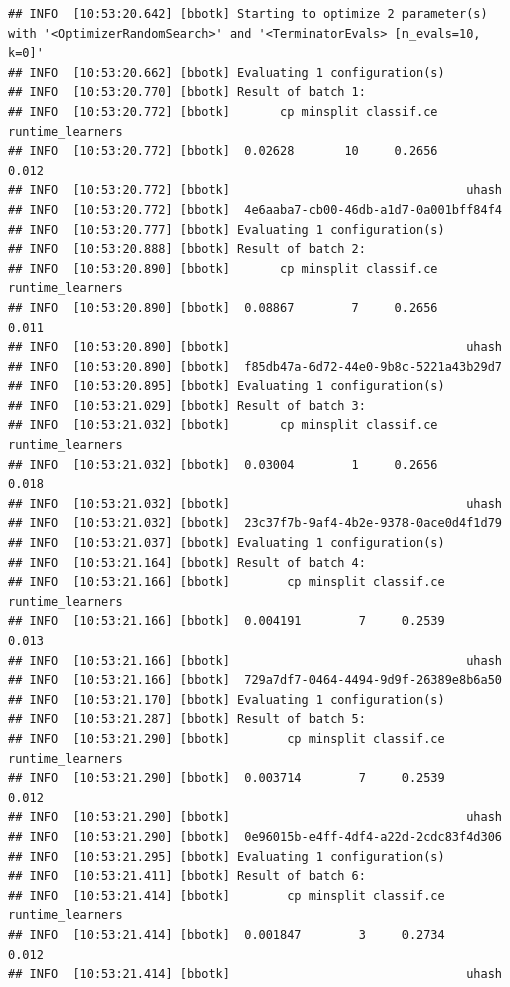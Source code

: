 \documentclass[
]{scrbook}
\begin{document}
\begin{verbatim}
## INFO  [10:53:20.642] [bbotk] Starting to optimize 2 parameter(s) with '<OptimizerRandomSearch>' and '<TerminatorEvals> [n_evals=10, k=0]' 
## INFO  [10:53:20.662] [bbotk] Evaluating 1 configuration(s) 
## INFO  [10:53:20.770] [bbotk] Result of batch 1: 
## INFO  [10:53:20.772] [bbotk]       cp minsplit classif.ce runtime_learners 
## INFO  [10:53:20.772] [bbotk]  0.02628       10     0.2656            0.012 
## INFO  [10:53:20.772] [bbotk]                                 uhash 
## INFO  [10:53:20.772] [bbotk]  4e6aaba7-cb00-46db-a1d7-0a001bff84f4 
## INFO  [10:53:20.777] [bbotk] Evaluating 1 configuration(s) 
## INFO  [10:53:20.888] [bbotk] Result of batch 2: 
## INFO  [10:53:20.890] [bbotk]       cp minsplit classif.ce runtime_learners 
## INFO  [10:53:20.890] [bbotk]  0.08867        7     0.2656            0.011 
## INFO  [10:53:20.890] [bbotk]                                 uhash 
## INFO  [10:53:20.890] [bbotk]  f85db47a-6d72-44e0-9b8c-5221a43b29d7 
## INFO  [10:53:20.895] [bbotk] Evaluating 1 configuration(s) 
## INFO  [10:53:21.029] [bbotk] Result of batch 3: 
## INFO  [10:53:21.032] [bbotk]       cp minsplit classif.ce runtime_learners 
## INFO  [10:53:21.032] [bbotk]  0.03004        1     0.2656            0.018 
## INFO  [10:53:21.032] [bbotk]                                 uhash 
## INFO  [10:53:21.032] [bbotk]  23c37f7b-9af4-4b2e-9378-0ace0d4f1d79 
## INFO  [10:53:21.037] [bbotk] Evaluating 1 configuration(s) 
## INFO  [10:53:21.164] [bbotk] Result of batch 4: 
## INFO  [10:53:21.166] [bbotk]        cp minsplit classif.ce runtime_learners 
## INFO  [10:53:21.166] [bbotk]  0.004191        7     0.2539            0.013 
## INFO  [10:53:21.166] [bbotk]                                 uhash 
## INFO  [10:53:21.166] [bbotk]  729a7df7-0464-4494-9d9f-26389e8b6a50 
## INFO  [10:53:21.170] [bbotk] Evaluating 1 configuration(s) 
## INFO  [10:53:21.287] [bbotk] Result of batch 5: 
## INFO  [10:53:21.290] [bbotk]        cp minsplit classif.ce runtime_learners 
## INFO  [10:53:21.290] [bbotk]  0.003714        7     0.2539            0.012 
## INFO  [10:53:21.290] [bbotk]                                 uhash 
## INFO  [10:53:21.290] [bbotk]  0e96015b-e4ff-4df4-a22d-2cdc83f4d306 
## INFO  [10:53:21.295] [bbotk] Evaluating 1 configuration(s) 
## INFO  [10:53:21.411] [bbotk] Result of batch 6: 
## INFO  [10:53:21.414] [bbotk]        cp minsplit classif.ce runtime_learners 
## INFO  [10:53:21.414] [bbotk]  0.001847        3     0.2734            0.012 
## INFO  [10:53:21.414] [bbotk]                                 uhash 

\end{verbatim}
\end{document}
